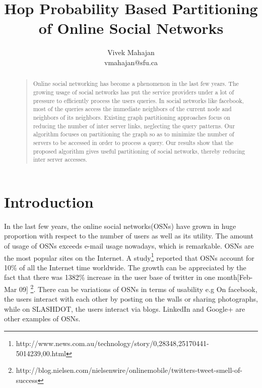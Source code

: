 \documentclass[letterpaper]{article}
\begin{document}
%
\title{Hop Probability Based Partitioning of Online Social Networks}
\author{Vivek Mahajan\\
vmahajan@sfu.ca\\
}
\maketitle
\begin{abstract}
\begin{quote}
Online social networking has  become a phenomenon in the last few years. The
growing usage of social networks has put the service providers under a lot of
pressure to efficiently process the users queries.  In social networks like
facebook, most of the queries access the immediate neighbors of the current node
and neighbors of its neighbors.  Existing graph partitioning approaches focus
on reducing the number of inter server links, neglecting the query patterns.
Our algorithm focuses on partitioning the graph so as to minimize the number of
servers to be accessed in order to process a query. Our results show that the
proposed algorithm gives useful partitioning of social networks, thereby
reducing inter server accesses.


\end{quote}
\end{abstract}

\section{Introduction}
    In the last few years, the online social networks(OSNs) have grown in huge
proportion with respect to the number of users as well as its utility. The
amount of usage of OSNs exceeds e-mail usage nowadays, which is remarkable.
OSNs are the most popular sites on the Internet. A
study\footnote{http://www.news.com.au/technology/story/0,28348,25170441-5014239,00.html}
reported that OSNs account for 10\% of all the Internet time worldwide. The
growth can be appreciated by the fact that there was 1382\% increase in the
user base of twitter in one month[Feb-Mar 09]
\footnote{http://blog.nielsen.com/nielsenwire/onlinemobile/twitters-tweet-smell-of-success}.
There can be variations of OSNs in terms of usability e.g On facebook, the users
interact with each other by posting on the walls or sharing photographs, while on
SLASHDOT, the users interact via blogs. LinkedIn and Google+ are other examples
of OSNs.
\end{document}
